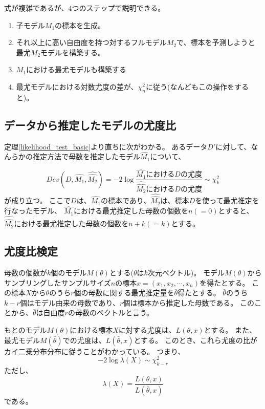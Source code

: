 式が複雑であるが、$4$つのステップで説明できる。
\begin{enumerate}
 \item 子モデル$M_1$の標本を生成。
 \item それ以上に高い自由度を持つ対するフルモデル$M_2$で、標本を予測しようと最尤$M_2$モデルを構築する。
 \item $M_1$における最尤モデルも構築する
 \item 最尤モデルにおける対数尤度の差が、$\chi^2_{n}$に従う(なんどもこの操作をすると)。
\end{enumerate}


\subsection{データから推定したモデルの尤度比}
定理\ref{likelihood_test_basic}より直ちに次がわかる。
あるデータ$D'$に対して、なんらかの推定方法で母数を推定したモデル$\hat{M_1}$について、
\begin{lemm} \label{likelihood_test_estimated_model}
 \begin{equation*}
  Dev(D,\hat{M_1},\hat{\hat{M_2}}) = -2\log\frac{\hat{M_1}におけるDの尤度}{\hat{\hat{M_2}}におけるDの尤度} \sim \chi^2_{k}
 \end{equation*}
が成り立つ。
ここで$D$は、$\hat{M_1}$の標本であり、$\hat{\hat{M_2}}$は、標本$D$を使って最尤推定を行なったモデル、
$\hat{M_1}$における最尤推定した母数の個数を$n(=0)$とすると、$\hat{\hat{M_2}}$における最尤推定した母数の個数を$n+k(=k)$とする。
\end{lemm}

\subsection{尤度比検定}
母数の個数が$k$個のモデル$M(\theta)$とする($\theta$は$k$次元ベクトル)。
モデル$M(\theta)$からサンプリングしたサンプルサイズ$n$の標本$x=(x_1,x_2,\cdots,x_n)$を得たとする。
この標本$X$から$\theta$のうち$r$個の母数に関する最尤推定量を$\bar{\theta}$得たとする。
$\bar{\theta}$のうち$k-r$個はモデル由来の母数であり、$r$個は標本から推定した母数である。
このことから、$\bar{\theta}$は自由度$r$の母数のベクトルと言う。

もとのモデル$M(\theta)$における標本$X$に対する尤度は、$L(\theta,x)$とする。
また、最尤モデル$M(\bar{\theta})$での尤度は、$L(\bar{\theta},x)$とする。
このとき、これら尤度の比がカイ二乗分布分布に従うことがわかっている。
つまり、
\begin{equation*}
    -2\log\lambda(X)\sim \chi^2_{k-r}
\end{equation*}
ただし、
\begin{equation*}
    \lambda(X) = \frac{L(\theta,x)}{L(\bar{\theta},x)} 
\end{equation*}
である。


